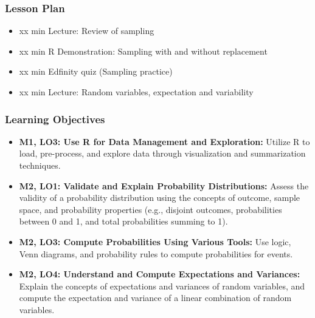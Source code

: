 \begin{frame}
    \frametitle{Lesson Plan}
    \begin{itemize}
        \item xx min Lecture: Review of sampling
        \item xx min R Demonstration: Sampling with and without replacement
        \item xx min Edfinity quiz (Sampling practice)
        \item xx min Lecture: Random variables, expectation and variability
    \end{itemize}
\end{frame}

\begin{frame}
    \frametitle{Learning Objectives}
    \begin{itemize}
        \item \textbf{M1, LO3: Use R for Data Management and Exploration:} Utilize R to load, pre-process, and explore data through visualization and summarization techniques.
        \item \textbf{M2, LO1: Validate and Explain Probability Distributions:} Assess the validity of a probability distribution using the concepts of outcome, sample space, and probability properties (e.g., disjoint outcomes, probabilities between 0 and 1, and total probabilities summing to 1).
        \item \textbf{M2, LO3: Compute Probabilities Using Various Tools:} Use logic, Venn diagrams, and probability rules to compute probabilities for events.
        \item \textbf{M2, LO4: Understand and Compute Expectations and Variances:} Explain the concepts of expectations and variances of random variables, and compute the expectation and variance of a linear combination of random variables.
    \end{itemize}
\end{frame}


